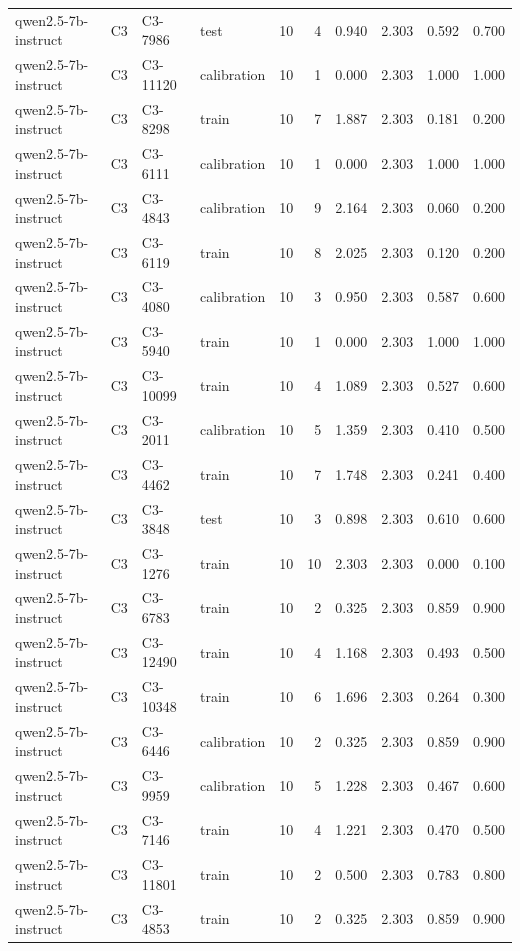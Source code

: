 \begin{table}
\begin{tabular}{llllrrrrrr}
qwen2.5-7b-instruct & C3 & C3-7986 & test & 10 & 4 & 0.940 & 2.303 & 0.592 & 0.700 \\
qwen2.5-7b-instruct & C3 & C3-11120 & calibration & 10 & 1 & 0.000 & 2.303 & 1.000 & 1.000 \\
qwen2.5-7b-instruct & C3 & C3-8298 & train & 10 & 7 & 1.887 & 2.303 & 0.181 & 0.200 \\
qwen2.5-7b-instruct & C3 & C3-6111 & calibration & 10 & 1 & 0.000 & 2.303 & 1.000 & 1.000 \\
qwen2.5-7b-instruct & C3 & C3-4843 & calibration & 10 & 9 & 2.164 & 2.303 & 0.060 & 0.200 \\
qwen2.5-7b-instruct & C3 & C3-6119 & train & 10 & 8 & 2.025 & 2.303 & 0.120 & 0.200 \\
qwen2.5-7b-instruct & C3 & C3-4080 & calibration & 10 & 3 & 0.950 & 2.303 & 0.587 & 0.600 \\
qwen2.5-7b-instruct & C3 & C3-5940 & train & 10 & 1 & 0.000 & 2.303 & 1.000 & 1.000 \\
qwen2.5-7b-instruct & C3 & C3-10099 & train & 10 & 4 & 1.089 & 2.303 & 0.527 & 0.600 \\
qwen2.5-7b-instruct & C3 & C3-2011 & calibration & 10 & 5 & 1.359 & 2.303 & 0.410 & 0.500 \\
qwen2.5-7b-instruct & C3 & C3-4462 & train & 10 & 7 & 1.748 & 2.303 & 0.241 & 0.400 \\
qwen2.5-7b-instruct & C3 & C3-3848 & test & 10 & 3 & 0.898 & 2.303 & 0.610 & 0.600 \\
qwen2.5-7b-instruct & C3 & C3-1276 & train & 10 & 10 & 2.303 & 2.303 & 0.000 & 0.100 \\
qwen2.5-7b-instruct & C3 & C3-6783 & train & 10 & 2 & 0.325 & 2.303 & 0.859 & 0.900 \\
qwen2.5-7b-instruct & C3 & C3-12490 & train & 10 & 4 & 1.168 & 2.303 & 0.493 & 0.500 \\
qwen2.5-7b-instruct & C3 & C3-10348 & train & 10 & 6 & 1.696 & 2.303 & 0.264 & 0.300 \\
qwen2.5-7b-instruct & C3 & C3-6446 & calibration & 10 & 2 & 0.325 & 2.303 & 0.859 & 0.900 \\
qwen2.5-7b-instruct & C3 & C3-9959 & calibration & 10 & 5 & 1.228 & 2.303 & 0.467 & 0.600 \\
qwen2.5-7b-instruct & C3 & C3-7146 & train & 10 & 4 & 1.221 & 2.303 & 0.470 & 0.500 \\
qwen2.5-7b-instruct & C3 & C3-11801 & train & 10 & 2 & 0.500 & 2.303 & 0.783 & 0.800 \\
qwen2.5-7b-instruct & C3 & C3-4853 & train & 10 & 2 & 0.325 & 2.303 & 0.859 & 0.900 \\

\end{tabular}
\end{table}
